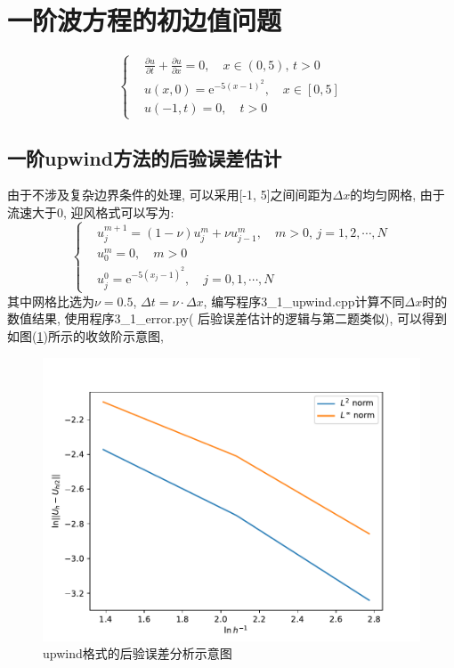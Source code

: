 \documentclass[a4paper,zihao=5,UTF8]{ctexart}
\def\e{\mathrm{e}}
\newcommand{\pdv}[2]{\frac{\partial{#1}}{\partial{#2}}}
\begin{document}
	\section{一阶波方程的初边值问题}
	\begin{equation}
		\left\{
			\begin{aligned}
				&\pdv{u}{t} + \pdv{u}{x} = 0,\quad x\in(0, 5),\,t > 0\\
				&u(x, 0) = \e^{-5(x - 1)^2}, \quad x\in [0, 5]\\
				&u(-1, t) = 0, \quad t > 0
			\end{aligned}	
		\right.
	\end{equation}
	\subsection{一阶upwind方法的后验误差估计}
	由于不涉及复杂边界条件的处理, 可以采用[-1, 5]之间间距为$\Delta x$的均匀网格, 由于
	流速大于0, 迎风格式可以写为:
	\begin{equation}
		\left\{
			\begin{aligned}
				&u_j^{m+1} = (1 - \nu)u_j^m + \nu u_{j-1}^m, \quad m > 0,\,j = 1, 2, \cdots, N\\
				&u_0^m = 0,\quad m > 0\\
				&u^0_j = \e^{-5(x_j - 1)^2}, \quad j = 0, 1, \cdots, N
			\end{aligned}
		\right.
	\end{equation}
	其中网格比选为$\nu = 0.5$, $\Delta t = \nu \cdot \Delta x$, 
	编写程序3\_1\_upwind.cpp计算不同$\Delta x$时的数值结果, 使用程序3\_1\_error.py(
	后验误差估计的逻辑与第二题类似), 可以得到如图(\ref{3-1-upwind})所示的收敛阶示意图, 
	\begin{figure}[htbp]
		\centering
		\includegraphics[scale=0.7]{3_1_error.pdf}
		\caption{upwind格式的后验误差分析示意图}
		\label{3-1-upwind}
	\end{figure}
\end{document}
